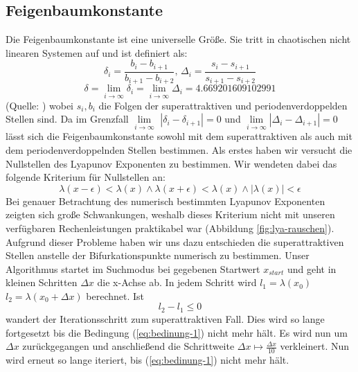 \documentclass[12pt,a4paper]{article}
\begin{document}
\subsection{Feigenbaumkonstante}
Die Feigenbaumkonstante ist eine universelle Größe. Sie tritt in chaotischen nicht linearen Systemen auf und ist definiert als:
\begin{equation}\delta_i = \frac{b_i-b_{i+1}}{b_{i+1}-b_{i+2}}\text{, }\Delta_i=\frac{s_i-s_{i+1}}{s_{i+1}-s_{i+2}}\end{equation}
\begin{equation}\delta = \lim\limits_{i \rightarrow \infty}{\delta_i}= \lim\limits_{i \rightarrow \infty}{\Delta_i} = 4.669201609102991\end{equation} 
(Quelle: \parencite{feigenbaum})
wobei $s_i, b_i$ die Folgen der superattraktiven und periodenverdoppelden Stellen sind.
Da im Grenzfall $\lim\limits_{i \rightarrow \infty}$ $|\delta_i - \delta_{i+1}|=0$ und $\lim\limits_{i \rightarrow \infty} |\Delta_i - \Delta_{i+1}|=0$  lässt sich die Feigenbaumkonstante sowohl mit dem superattraktiven als auch mit dem periodenverdoppelnden Stellen bestimmen. 
Als erstes haben wir versucht die Nullstellen des Lyapunov Exponenten zu bestimmen. Wir wendeten dabei das folgende Kriterium für Nullstellen an:
\begin{equation}
\lambda(x-\epsilon) < \lambda(x) \wedge \lambda(x+\epsilon) < \lambda(x) \wedge |\lambda(x)|<\epsilon
\end{equation}
Bei genauer Betrachtung des numerisch bestimmten Lyapunov Exponenten zeigten sich große Schwankungen, weshalb dieses Kriterium nicht mit unseren verfügbaren Rechenleistungen praktikabel war (Abbildung \ref{fig:lya-rauschen}).
Aufgrund dieser Probleme
haben wir uns dazu entschieden die superattraktiven Stellen anstelle der Bifurkationspunkte numerisch zu bestimmen. Unser Algorithmus startet im Suchmodus bei gegebenen Startwert $x_{start}$ und geht in kleinen Schritten $\Delta x$ die x-Achse ab. In jedem Schritt wird $l_1=\lambda(x_0)$ $l_2=\lambda(x_0 + \Delta x)$ berechnet. 
Ist
\begin{equation}
l_2-l_1 \leq 0 
\label{eq:bedinung-1}
\end{equation}
wandert der Iterationsschritt zum superattraktiven Fall. 
Dies wird so lange fortgesetzt bis die Bedingung (\ref{eq:bedinung-1}) nicht mehr hält. 
Es wird nun um $\Delta x$ zurückgegangen und anschließend die Schrittweite $\Delta x \mapsto \frac{\Delta x}{10} $ verkleinert. Nun wird erneut so lange iteriert, bis (\ref{eq:bedinung-1}) nicht mehr hält. 
\end{document}
